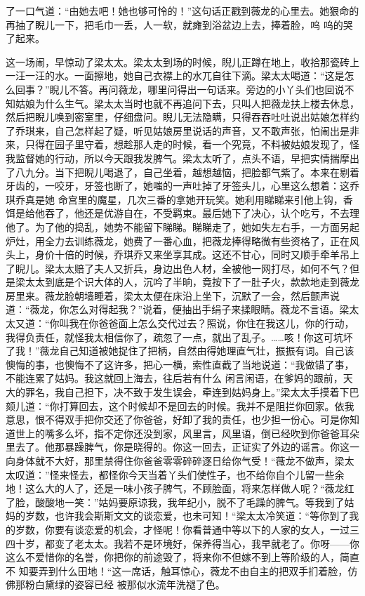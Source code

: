 \documentclass{article}
\begin{document}
\newpage
了一口气道：“由她去吧！她也够可怜的！”这句话正戳到薇龙的心里去。她狠命的再抽了睨儿一下，把毛巾一丢，人一软，就瘫到浴盆边上去，捧着脸，呜
呜的哭了起来。 

这一场闹，早惊动了梁太太。梁太太到场的时候，睨儿正蹲在地上，收拾那瓷砖上一汪一汪的水。一面擦地，她自己衣襟上的水兀自往下滴。梁太太喝道：“这是怎么回事？”睨儿不答。再问薇龙，哪里问得出一句话来。旁边的小丫头们也回说不知姑娘为什么生气。梁太太当时也就不再追问下去，只叫人把薇龙扶上楼去休息，然后把睨儿唤到密室里，仔细盘问。睨儿无法隐瞒，只得吞吞吐吐说出姑娘怎样约了乔琪来，自己怎样起了疑，听见姑娘房里说话的声音，又不敢声张，怕闹出是非来，只得在园子里守着，想趁那人走的时候，看一个究竟，不料被姑娘发现了，怪我监督她的行动，所以今天跟我发脾气。梁太太听了，点头不语，早把实情揣摩出了八九分。当下把睨儿喝退了，自己坐着，越想越恼，把脸都气紫了。本来在剔着牙齿的，一咬牙，牙签也断了，她嗤的一声吐掉了牙签头儿，心里这么想着：这乔琪乔真是她
\newpage
命宫里的魔星，几次三番的拿她开玩笑。她利用睇睇来引他上钩，香饵是给他吞了，他还是优游自在，不受羁束。最后她下了决心，认个吃亏，不去理他了。为了他的捣乱，她势不能留下睇睇。睇睇走了，她如失左右手，一方面另起炉灶，用全力去训练薇龙，她费了一番心血，把薇龙捧得略微有些资格了，正在风头上，身价十倍的时候，乔琪乔又来坐享其成。这还不甘心，同时又顺手牵羊吊上了睨儿。梁太太赔了夫人又折兵，身边出色人材，全被他一网打尽，如何不气？但是梁太太到底是个识大体的人，沉吟了半晌，竟按下了一肚子火，款款地走到薇龙房里来。薇龙脸朝墙睡着，梁太太便在床沿上坐下，沉默了一会，然后颤声说道：“薇龙，你怎么对得起我？”说着，便抽出手绢子来揉眼睛。薇龙不言语。梁太太又道：“你叫我在你爸爸面上怎么交代过去？照说，你住在我这儿，你的行动，我得负责任，就怪我太相信你了，疏忽了一点，就出了乱子。……咳！你这可坑坏了我！”薇龙自己知道被她捉住了把柄，自然由得她理直气壮，振振有词。自己该懊悔的事，也懊悔不了这许多，把心一横，索性直截了当地说道：“我做错了事，不能连累了姑妈。我这就回上海去，往后若有什么
\newpage
闲言闲语，在爹妈的跟前，天大的罪名，我自己担下，决不致于发生误会，牵连到姑妈身上。”梁太太手摸着下巴颏儿道：“你打算回去，这个时候却不是回去的时候。我并不是阻拦你回家。依我意思，恨不得双手把你交还了你爸爸，好卸了我的责任，也少担一份心。可是你知道世上的嘴多么坏，指不定你还没到家，风里言，风里语，倒已经吹到你爸爸耳朵里去了。他那暴躁脾气，你是晓得的。你这一回去，正证实了外边的谣言。你这一向身体就不大好，那里禁得住你爸爸零零碎碎逐日给你气受！“薇龙不做声，梁太太叹道：”怪来怪去，都怪你今天当着丫头们使性子，也不给你自个儿留一些余地！这么大的人了，还是一味小孩子脾气，不顾脸面，将来怎样做人呢？“薇龙红了脸，酸酸地一笑：”姑妈要原谅我，我年纪小，脱不了毛躁的脾气。等我到了姑妈的岁数，也许我会斯斯文文的谈恋爱，也未可知！“梁太太冷笑道：“等你到了我的岁数，你要有谈恋爱的机会，才怪呢！你看普通中等以下的人家的女人，一过三四十岁，都变了老太太。我若不是环境好，保养得当心，我早就老了。你呀——你这么不爱惜你的名誉，你把你的前途毁了，将来你不但嫁不到上等阶级的人，简直不
\newpage
知要弄到什么田地！“这一席话，触耳惊心，薇龙不由自主的把双手扪着脸，仿佛那粉白黛绿的姿容已经
被那似水流年洗褪了色。 
\end{document}
